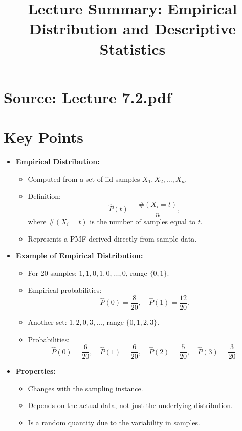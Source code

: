 \documentclass{article}
\title{Lecture Summary: Empirical Distribution and Descriptive Statistics}
\author{}
\date{}
\begin{document}
\maketitle

\section*{Source: Lecture 7.2.pdf}

\section*{Key Points}

\begin{itemize}
  \item \textbf{Empirical Distribution:}
    \begin{itemize}
      \item Computed from a set of iid samples $X_1, X_2, \dots, X_n$.
      \item Definition:
        \[
          \hat{P}(t) = \frac{\#(X_i = t)}{n},
        \]
        where $\#(X_i = t)$ is the number of samples equal to $t$.
      \item Represents a PMF derived directly from sample data.
    \end{itemize}

  \item \textbf{Example of Empirical Distribution:}
    \begin{itemize}
      \item For 20 samples: $1, 1, 0, 1, 0, \dots, 0$, range $\{0, 1\}$.
      \item Empirical probabilities:
        \[
          \hat{P}(0) = \frac{8}{20}, \quad \hat{P}(1) = \frac{12}{20}.
        \]
      \item Another set: $1, 2, 0, 3, \dots$, range $\{0, 1, 2, 3\}$.
      \item Probabilities:
        \[
          \hat{P}(0) = \frac{6}{20}, \quad \hat{P}(1) = \frac{6}{20}, \quad \hat{P}(2) = \frac{5}{20}, \quad \hat{P}(3) = \frac{3}{20}.
        \]
    \end{itemize}

  \item \textbf{Properties:}
    \begin{itemize}
      \item Changes with the sampling instance.
      \item Depends on the actual data, not just the underlying distribution.
      \item Is a random quantity due to the variability in samples.
    \end{itemize}


\end{itemize}
\end{document}

